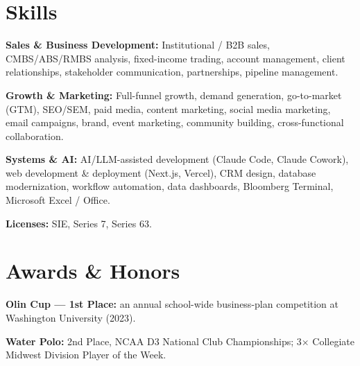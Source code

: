 \documentclass[letterpaper,10pt]{article}
\begin{document}
\section{Skills}
\textbf{Sales \& Business Development:} Institutional / B2B sales, CMBS/ABS/RMBS analysis, fixed-income trading, account management, client relationships, stakeholder communication, partnerships, pipeline management.\par
\vspace{2pt}
\textbf{Growth \& Marketing:} Full-funnel growth, demand generation, go-to-market (GTM), SEO/SEM, paid media, content marketing, social media marketing, email campaigns, brand, event marketing, community building, cross-functional collaboration.\par
\vspace{2pt}
\textbf{Systems \& AI:} AI/LLM-assisted development (Claude Code, Claude Cowork), web development \& deployment (Next.js, Vercel), CRM design, database modernization, workflow automation, data dashboards, Bloomberg Terminal, Microsoft Excel / Office.\par
\vspace{2pt}
\textbf{Licenses:} SIE, Series 7, Series 63.

\section{Awards \& Honors}
\begin{points}
  \item \textbf{Olin Cup --- 1st Place:} an annual school-wide business-plan competition at Washington University (2023).
  \item \textbf{Water Polo:} 2nd Place, NCAA D3 National Club Championships; 3$\times$ Collegiate Midwest Division Player of the Week.
\end{points}
\end{document}
